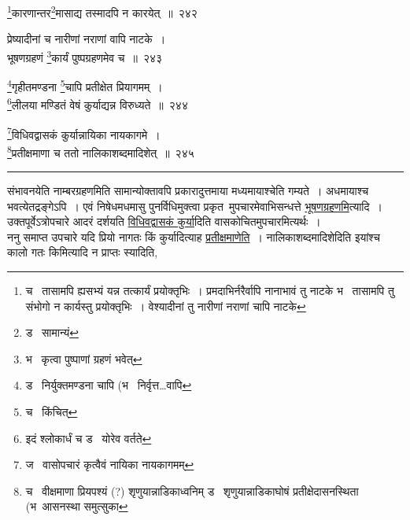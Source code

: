\documentclass[11pt, openany]{book}
\begin{document}
\begin{center}
{\na \renewcommand{\thefootnote}{1}\footnote{च \textendash\  तासामपि ह्यसभ्यं यन्न तत्कार्यं प्रयोक्तृभिः~। प्रमदाभिर्नरैर्वापि नानाभावं तु नाटके भ \textendash\  तासामपि तु संभोगो न कार्यस्तु प्रयोक्तृभिः~। वेश्यादीनां तु नारीणां नराणां चापि नाटके}कारणान्तर\renewcommand{\thefootnote}{2}\footnote{ड \textendash\  सामान्यं}मासाद्य तस्मादपि न कारयेत्~॥~२४२

प्रेष्यादीनां च नारीणां नराणां वापि नाटके~।\\
भूषणग्रहणं \renewcommand{\thefootnote}{3}\footnote{भ \textendash\  कृत्वा पुष्पाणां ग्रहणं भवेत्}कार्यं पुष्पग्रहणमेव च~॥~२४३

\renewcommand{\thefootnote}{4}\footnote{ड \textendash\ निर्युक्तमण्डना चापि (भ \textendash\  निर्वृत्त\ldots वापि}गृहीतमण्डना \renewcommand{\thefootnote}{5}\footnote{च \textendash\  किंचित्}चापि प्रतीक्षेत प्रियागमम्~।\\
\renewcommand{\thefootnote}{6}\footnote{इदं श्लोकार्धं च ड \textendash\  योरेव वर्तते}लीलया मण्डितं वेषं कुर्याद्यन्न विरुध्यते~॥~२४४

\renewcommand{\thefootnote}{7}\footnote{ज \textendash\  वासोपचारं कृत्वैवं नायिका नायकागमम्}विधिवद्वासकं कुर्यान्नायिका नायकागमे~।\\
\renewcommand{\thefootnote}{8}\footnote{च \textendash\  वीक्षमाणा प्रियपश्यं (?) शृणुयान्नाडिकाध्वनिम् ड \textendash\  शृणुयान्नाडिकाघोषं प्रतीक्षेदासनस्थिता (भ\textendash\ आसनस्था समुत्सुका}प्रतीक्षमाणा च ततो नालिकाशब्दमादिशेत्~॥~२४५}
\end{center}

\hrule

\vspace{2mm}
\noindent
संभावनयेति नाम्बरग्रहणमिति सामान्योक्तावपि प्रकारादुत्तमाया मध्यमायाश्चेति गम्यते~। अधमायाश्च भवत्येतद्रङ्गेऽपि~। एवं निषेधमधमासु पुनर्विधिमुक्त्वा प्रकृत\textendash\ मुपचारमेवाभिसन्धत्ते \underline{भूषणग्रहणमि}त्यादि~। उक्तपूर्वेऽत्रोपचारे आदरं दर्शयति \underline{विधिवद्वासकं कुर्या}दिति वासकोचितमुपचारमित्यर्थः~।\\

ननु समाप्त उपचारे यदि प्रियो नागतः किं कुर्यादित्याह \underline{प्रतीक्षमाणेति}~। नालिकाशब्दमादिशेदिति इयांश्च कालो गतः किमित्यादि न प्राप्तः स्यादिति,

\newpage
\end{document}
